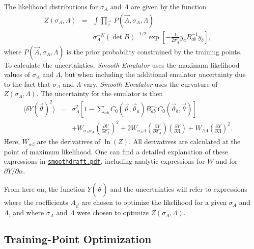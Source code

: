 \documentclass[UserManual.tex]{subfiles}
\begin{document}
The likelihood distributions for $\sigma_A$ and $\Lambda$ are given by the function
\begin{eqnarray}
Z(\sigma_A,\Lambda)&=&\int\prod_{\vec{i}}~P(\vec{A},\sigma_A,\Lambda)\\
\nonumber
&=&\sigma_A^{-N}(\det{B})^{-1/2}\exp\left[-\frac{1}{2\sigma_A^2}y_aB^{-1}_{ab}y_b\right],
\end{eqnarray}
where $P(\vec{A},\sigma_A,\Lambda)$ is the prior probability constrained by the training points. To calculate the uncertainties, {\it Smooth Emulator} uses the maximum likelihood values of $\sigma_A$ and $\Lambda$, but when including the additional emulator uncertainty due to the fact that $\sigma_A$ and $\Lambda$ vary, {\it Smooth Emulator} uses the curvature of $Z(\sigma_A,\Lambda)$.
The uncertainty for the emulator is then
\begin{eqnarray}\label{eq:delY2}
\langle\delta Y(\vec{\theta})^2\rangle&=&
\nonumber
\sigma_A^2\left[1-\sum_{ab}C_0(\vec{\theta},\vec{\theta}_a)B^{-1}_{ab}C_0(\vec{\theta}_b,\vec{\theta})\right]\\
\nonumber
&&+W_{\sigma_A\sigma_A}\left(\frac{\partial Y}{\partial\sigma_A}\right)^2
+2W_{\sigma_A\Lambda}\left(\frac{\partial Y}{\partial\sigma_A}\right)\left(\frac{\partial Y}{\partial\Lambda}\right)
+W_{\Lambda\Lambda}\left(\frac{\partial Y}{\partial\Lambda}\right)^2.
\end{eqnarray}
Here, $W_{\alpha\beta}$ are the derivatives of $\ln(Z)$. All derivatives are calculated at the point of maximum likelihood. One can find a detailed explanation of these expressions in \href{./smoothdraft.pdf}{{\tt smoothdraft.pdf}}, including analytic expressions for $W$ and for $\partial Y/\partial\alpha$.

From here on, the function $Y(\vec{\theta})$ and the uncertainties will refer to expressions where the coefficients $A_{\vec{n}}$ are chosen to optimize the likelihood for a given $\sigma_A$ and $\Lambda$, and where $\sigma_A$ and $\Lambda$ were chosen to optimize $Z(\sigma_A,\Lambda)$.

\subsection{Training-Point Optimization}
\end{document}
